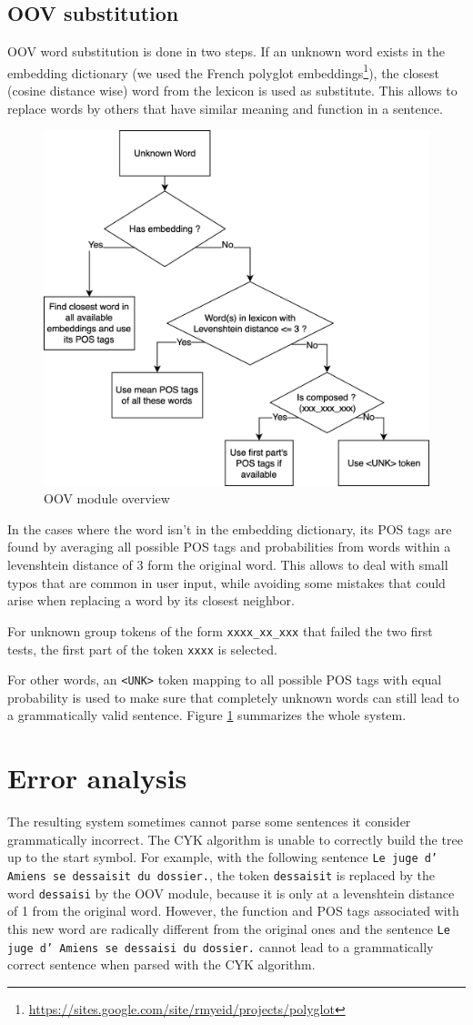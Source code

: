 \documentclass[11pt]{article}
\begin{document}
    \subsection{OOV substitution}
    OOV word substitution is done in two steps. If an unknown word exists in 
    the embedding dictionary (we used the French polyglot embeddings\footnote{
    \url{https://sites.google.com/site/rmyeid/projects/polyglot}}), the closest 
    (cosine distance wise) word from the lexicon is used as substitute. This 
    allows to replace words by others that have similar meaning and function in 
    a sentence.
    \begin{figure}[h]
        \centering
        \includegraphics[width=.4\linewidth]{oov.png}
        \caption{OOV module overview}
        \label{fig:oov}
    \end{figure}

    In the cases where the word isn't in the embedding dictionary, its POS tags
    are found by averaging all possible POS tags and probabilities from words 
    within a levenshtein distance of 3 form the original word. This allows to 
    deal with small typos that are common in user input, while avoiding some 
    mistakes that could arise when replacing a word by its closest neighbor. 

    For unknown group tokens of the form \texttt{xxxx\_xx\_xxx} that failed 
    the two first tests, the first part of the token \texttt{xxxx} is selected. 

    For other words, an \texttt{<UNK>} token mapping to all possible POS tags 
    with equal probability is used to make sure that completely unknown words 
    can still lead to a grammatically valid sentence. Figure \ref{fig:oov} 
    summarizes the whole system.

    \section{Error analysis}
    The resulting system sometimes cannot parse some sentences it consider 
    grammatically incorrect.
    The CYK algorithm is unable to correctly build the tree up to the start
    symbol. For 
    example, with the following sentence
    \texttt{Le juge d' Amiens se dessaisit du dossier.}, the token 
    \texttt{dessaisit} is replaced by the word \texttt{dessaisi} by the OOV 
    module, because it is only at a levenshtein distance of 1 from the original 
    word.
    However, the function and POS tags associated with
    this new word are radically different from the original ones and the 
    sentence \texttt{Le juge d' Amiens se dessaisi du dossier.} cannot lead to 
    a grammatically correct sentence when parsed with the CYK algorithm.
\end{document}
